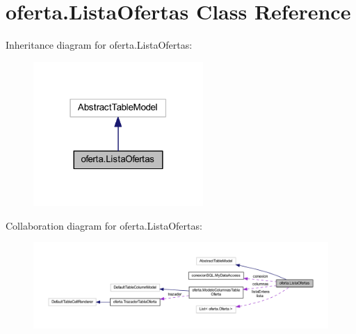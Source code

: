 \hypertarget{classoferta_1_1_lista_ofertas}{}\section{oferta.\+Lista\+Ofertas Class Reference}
\label{classoferta_1_1_lista_ofertas}


Inheritance diagram for oferta.\+Lista\+Ofertas\+:
\nopagebreak
\begin{figure}[H]
\begin{center}
\leavevmode
\includegraphics[width=183pt]{classoferta_1_1_lista_ofertas__inherit__graph}
\end{center}
\end{figure}


Collaboration diagram for oferta.\+Lista\+Ofertas\+:
\nopagebreak
\begin{figure}[H]
\begin{center}
\leavevmode
\includegraphics[width=350pt]{classoferta_1_1_lista_ofertas__coll__graph}
\end{center}
\end{figure}
